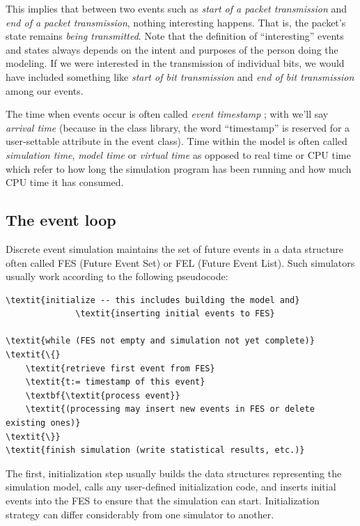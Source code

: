 This implies that between two events such as \textit{start of a packet
transmission} and \textit{end of a packet transmission}, nothing
interesting happens. That is, the packet's state remains \textit{being
transmitted}. Note that the definition of ``interesting'' events and states always
depends on the intent and purposes of the person doing the modeling.
If we were interested in the transmission of individual bits, we would
have included something like \textit{start of bit transmission} and
\textit{end of bit transmission} among our events.


The time when events occur is often called \textit{event timestamp}
; with {\opp} we'll say
\textit{arrival time} (because in the class
library, the word ``timestamp'' is reserved for a user-settable
attribute in the event class). Time within the model is often called
\textit{simulation time}, \textit{model time}
 or \textit{virtual time}
as opposed to real time or CPU time
which refer to how long the simulation program has been running and
how much CPU time it has consumed.



\subsection{The event loop}
\label{sec:simple-modules:event-loop}

Discrete event simulation maintains the set of future
events in a data structure often called
FES (Future Event Set) or FEL (Future Event List).
Such simulators usually work according to the following pseudocode:

\begin{Verbatim}[commandchars=\\\{\}]
\textit{initialize -- this includes building the model and}
              \textit{inserting initial events to FES}

\textit{while (FES not empty and simulation not yet complete)}
\textit{\{}
    \textit{retrieve first event from FES}
    \textit{t:= timestamp of this event}
    \textbf{\textit{process event}}
    \textit{(processing may insert new events in FES or delete existing ones)}
\textit{\}}
\textit{finish simulation (write statistical results, etc.)}
\end{Verbatim}


The first, initialization step usually builds the data structures
representing the simulation model, calls any user-defined
initialization code, and inserts initial events
into the FES to ensure that the simulation can start. Initialization
strategy can differ considerably from one simulator to another.


